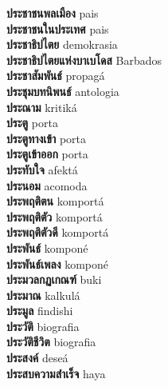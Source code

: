 \textbf{ ประชาชนพลเมือง  } pais \\
\textbf{ ประชาชนในประเทศ  } pais \\
\textbf{ ประชาธิปไตย  } demokrasia \\
\textbf{ ประชาธิปไตยแห่งบาเบโดส  } Barbados \\
\textbf{ ประชาสัมพันธ์  } propagá \\
\textbf{ ประชุมบทนิพนธ์  } antologia \\
\textbf{ ประณาม  } kritiká \\
\textbf{ ประตู  } porta \\
\textbf{ ประตูทางเข้า  } porta \\
\textbf{ ประตูเข้าออก  } porta \\
\textbf{ ประทับใจ  } afektá \\
\textbf{ ประนอม  } acomoda \\
\textbf{ ประพฤติตน  } komportá \\
\textbf{ ประพฤติตัว  } komportá \\
\textbf{ ประพฤติตัวดี  } komportá \\
\textbf{ ประพันธ์  } komponé \\
\textbf{ ประพันธ์เพลง  } komponé \\
\textbf{ ประมวลกฏเกณฑ์  } buki \\
\textbf{ ประมาณ  } kalkulá \\
\textbf{ ประมูล  } findishi \\
\textbf{ ประวัติ  } biografia \\
\textbf{ ประวัติชีวิต  } biografia \\
\textbf{ ประสงค์  } deseá \\
\textbf{ ประสบความสำเร็จ  } haya \\
